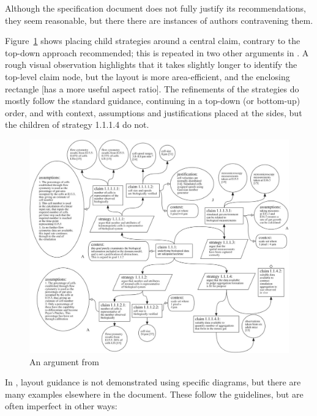 Although the specification document does not fully justify its recommendations, they seem reasonable, but there there are instances of authors contravening them.

Figure~\ref{fig:aldencentral} shows \citet{royal} placing child strategies around a central claim, contrary to the top-down approach recommended; this is repeated in two other arguments in \cite[pp.~8--9]{royal} .
A rough visual observation highlights that it takes slightly longer to identify the top-level claim node, but the layout is more area-efficient, and the enclosing rectangle  [has a more useful aspect ratio].
The refinements of the strategies do mostly follow the standard guidance, continuing in a top-down (or bottom-up) order, and with context, assumptions and justifications placed at the sides, but the children of strategy 1.1.1.4 do not.

\begin{figure}
    \includegraphics[width=\textwidth]{graphics/aldencentral.jpg}
    \caption{An argument from }
    \label{fig:aldencentral}
\end{figure}

In \cite{gsnstandard}, layout guidance is not demonstrated using specific diagrams, but there are many examples elsewhere in the document. These follow the guidelines, but are often imperfect in other ways:


